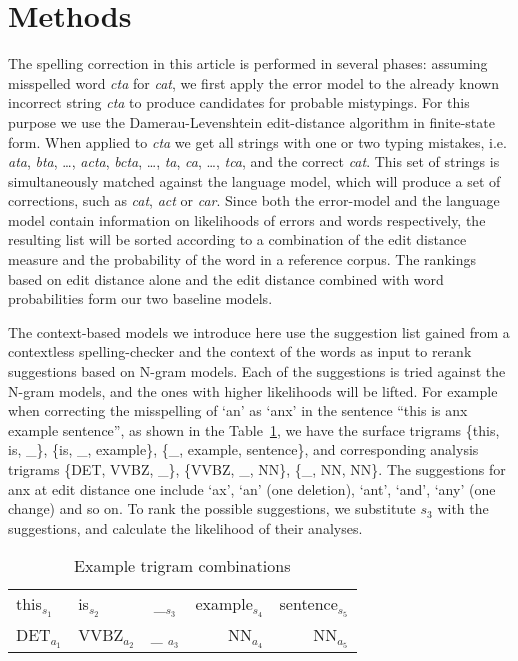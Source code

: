 \documentclass[postprint]{flammie}
\begin{document}
\section{Methods}
\label{sec:methods}

The spelling correction in this article is performed in several phases:
assuming misspelled word \emph{cta} for \emph{cat}, we first apply the error
model to the already known incorrect string \emph{cta} to produce candidates
for probable mistypings. For this purpose we use the Damerau-Levenshtein
edit-distance algorithm in finite-state form. When applied to \emph{cta} we get
all strings with one or two typing mistakes, i.e. \emph{ata}, \emph{bta},
\ldots, \emph{acta}, \emph{bcta}, \ldots, \emph{ta}, \emph{ca}, \ldots,
\emph{tca}, and the correct \emph{cat}. This set of strings is simultaneously
matched against the language model, which will produce a set of corrections,
such as \emph{cat}, \emph{act} or \emph{car}. Since both the error-model and
the language model contain information on likelihoods of errors and words
respectively, the resulting list will be sorted according to a combination of
the edit distance measure and the probability of the word in a reference
corpus.  The rankings based on edit distance alone and the edit distance
combined with word probabilities form our two baseline models. 

The context-based models we introduce here use the suggestion list gained from
a contextless spelling-checker and the context of the words as input to rerank
suggestions based on N-gram models. Each of the suggestions is tried against
the N-gram models, and the ones with higher likelihoods will be lifted.  For
example when correcting the misspelling of `an' as `anx' in the sentence ``this
is anx example sentence'', as shown in the Table~\ref{fig:example}, we have the
surface trigrams \{this, is, \_\}, \{is, \_, example\}, \{\_, example,
sentence\}, and corresponding analysis trigrams \{DET, VVBZ, \_\}, \{VVBZ, \_,
NN\}, \{\_, NN, NN\}. The suggestions for anx at edit distance one include
`ax', `an' (one deletion), `ant', `and', `any' (one change) and so on. To rank
the possible suggestions, we substitute $s_3$ with the suggestions, and
calculate the likelihood of their analyses. 

\begin{table}
\caption{Example trigram combinations\label{fig:example}}
\begin{center}
\begin{tabular}{llcrr}
\hline
this$_{s_1}$ & is$_{s_2}$ & \_$_{s_3}$ & example$_{s_4}$ & sentence$_{s_5}$\\
DET$_{a_1}$ & VVBZ$_{a_2}$ & \_ $_{a_3}$& NN$_{a_4}$ & NN$_{a_5}$\\
\hline
\end{tabular}
\end{center}
\end{table}
\end{document}
